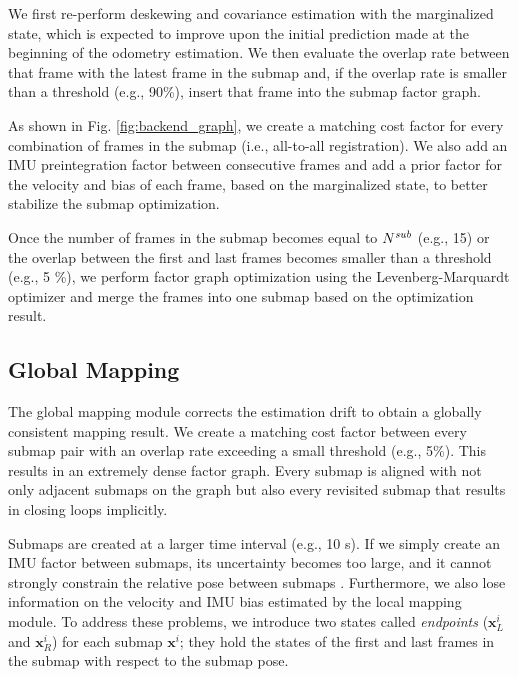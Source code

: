 \documentclass[letterpaper, 10 pt, conference]{ieeeconf}  %
\begin{document}
We first re-perform deskewing and covariance estimation with the marginalized state, which is expected to improve upon the initial prediction made at the beginning of the odometry estimation. We then evaluate the overlap rate between that frame with the latest frame in the submap and, if the overlap rate is smaller than a threshold (e.g., 90\%), insert that frame into the submap factor graph.

As shown in Fig. \ref{fig:backend_graph}, we create a matching cost factor for every combination of frames in the submap (i.e., all-to-all registration). We also add an IMU preintegration factor between consecutive frames and add a prior factor for the velocity and bias of each frame, based on the marginalized state, to better stabilize the submap optimization.

Once the number of frames in the submap becomes equal to $N^{\text{\it sub}}$ (e.g., 15) or the overlap between the first and last frames becomes smaller than a threshold (e.g., 5 \%), we perform factor graph optimization using the Levenberg-Marquardt optimizer \cite{Levenberg1944} and merge the frames into one submap based on the optimization result.

\subsection{Global Mapping}
\label{sec:global_mapping}

The global mapping module corrects the estimation drift to obtain a globally consistent mapping result. We create a matching cost factor between every submap pair with an overlap rate exceeding a small threshold (e.g., 5\%). This results in an extremely dense factor graph. Every submap is aligned with not only adjacent submaps on the graph but also every revisited submap that results in closing loops implicitly.

Submaps are created at a larger time interval (e.g., 10 s). If we simply create an IMU factor between submaps, its uncertainty becomes too large, and it cannot strongly constrain the relative pose between submaps \cite{Stumberg2018,MurArtal2017a}. Furthermore, we also lose information on the velocity and IMU bias estimated by the local mapping module. To address these problems, we introduce two states called {\it endpoints} (${\bm x}^i_L$ and ${\bm x}^i_R$) for each submap ${\bm x}^i$; they hold the states of the first and last frames in the submap with respect to the submap pose.
\end{document}
